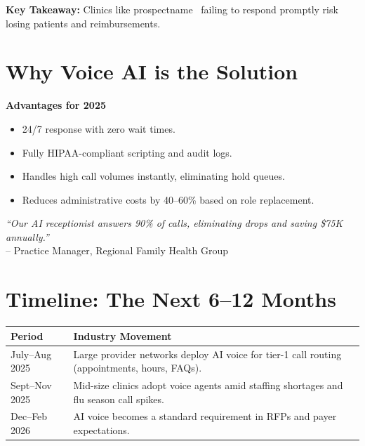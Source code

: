 \documentclass[12pt]{article}
\newcommand{\prospectname}{{ prospectname }}
\begin{document}
\textbf{Key Takeaway:} Clinics like\prospectname\ failing to respond promptly risk losing patients and reimbursements.

\newpage

\section*{Why Voice AI is the Solution}
\textbf{Advantages for 2025}
\begin{itemize}
    \item 24/7 response with zero wait times.
    \item Fully HIPAA-compliant scripting and audit logs.
    \item Handles high call volumes instantly, eliminating hold queues.
    \item Reduces administrative costs by 40--60\% based on role replacement.
\end{itemize}

\vspace{0.8cm}
\begin{flushright}
    \textit{``Our AI receptionist answers 90\% of calls, eliminating drops and saving \$75K annually.''} \\
    -- Practice Manager, Regional Family Health Group
\end{flushright}

\vspace{1cm}

\section*{Timeline: The Next 6--12 Months}
\begin{tabular}{>{\raggedright\arraybackslash}p{3.5cm} >{\raggedright\arraybackslash}p{9cm}}
    \toprule
    \textbf{Period} & \textbf{Industry Movement} \\
    \midrule
    \addlinespace[0.3cm]
    July--Aug 2025 & Large provider networks deploy AI voice for tier-1 call routing (appointments, hours, FAQs). \\
    \addlinespace[0.3cm]
    Sept--Nov 2025 & Mid-size clinics adopt voice agents amid staffing shortages and flu season call spikes. \\
    \addlinespace[0.3cm]
    Dec--Feb 2026 & AI voice becomes a standard requirement in RFPs and payer expectations. \\
    \bottomrule
\end{tabular}
\end{document}
